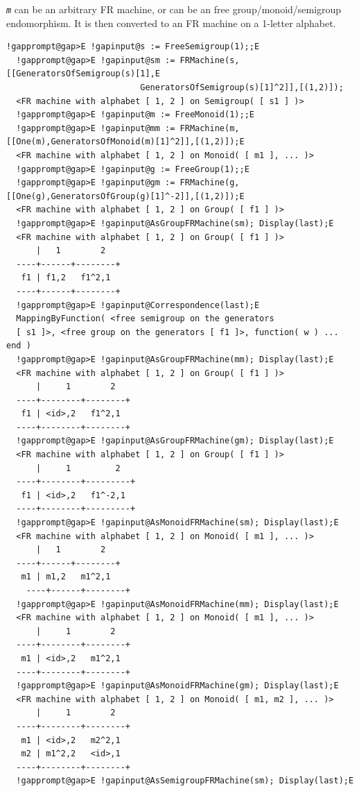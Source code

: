 \documentclass[a4paper,11pt]{report}
\begin{document}
{{{\mbox{\texttt{\mdseries\slshape m}} can be an arbitrary FR machine, or can be an free group/monoid/semigroup
endomorphism. It is then converted to an FR machine on a 1-letter alphabet. 
\begin{Verbatim}[commandchars=!@E,fontsize=\small,frame=single,label=Example]
  !gapprompt@gap>E !gapinput@s := FreeSemigroup(1);;E
  !gapprompt@gap>E !gapinput@sm := FRMachine(s,[[GeneratorsOfSemigroup(s)[1],E
                           GeneratorsOfSemigroup(s)[1]^2]],[(1,2)]);
  <FR machine with alphabet [ 1, 2 ] on Semigroup( [ s1 ] )>
  !gapprompt@gap>E !gapinput@m := FreeMonoid(1);;E
  !gapprompt@gap>E !gapinput@mm := FRMachine(m,[[One(m),GeneratorsOfMonoid(m)[1]^2]],[(1,2)]);E
  <FR machine with alphabet [ 1, 2 ] on Monoid( [ m1 ], ... )>
  !gapprompt@gap>E !gapinput@g := FreeGroup(1);;E
  !gapprompt@gap>E !gapinput@gm := FRMachine(g,[[One(g),GeneratorsOfGroup(g)[1]^-2]],[(1,2)]);E
  <FR machine with alphabet [ 1, 2 ] on Group( [ f1 ] )>
  !gapprompt@gap>E !gapinput@AsGroupFRMachine(sm); Display(last);E
  <FR machine with alphabet [ 1, 2 ] on Group( [ f1 ] )>
      |   1        2
  ----+------+--------+
   f1 | f1,2   f1^2,1
  ----+------+--------+
  !gapprompt@gap>E !gapinput@Correspondence(last);E
  MappingByFunction( <free semigroup on the generators
  [ s1 ]>, <free group on the generators [ f1 ]>, function( w ) ... end )
  !gapprompt@gap>E !gapinput@AsGroupFRMachine(mm); Display(last);E
  <FR machine with alphabet [ 1, 2 ] on Group( [ f1 ] )>
      |     1        2
  ----+--------+--------+
   f1 | <id>,2   f1^2,1
  ----+--------+--------+
  !gapprompt@gap>E !gapinput@AsGroupFRMachine(gm); Display(last);E
  <FR machine with alphabet [ 1, 2 ] on Group( [ f1 ] )>
      |     1         2
  ----+--------+---------+
   f1 | <id>,2   f1^-2,1
  ----+--------+---------+
  !gapprompt@gap>E !gapinput@AsMonoidFRMachine(sm); Display(last);E
  <FR machine with alphabet [ 1, 2 ] on Monoid( [ m1 ], ... )>
      |   1        2
  ----+------+--------+
   m1 | m1,2   m1^2,1
    ----+------+--------+
  !gapprompt@gap>E !gapinput@AsMonoidFRMachine(mm); Display(last);E
  <FR machine with alphabet [ 1, 2 ] on Monoid( [ m1 ], ... )>
      |     1        2
  ----+--------+--------+
   m1 | <id>,2   m1^2,1
  ----+--------+--------+
  !gapprompt@gap>E !gapinput@AsMonoidFRMachine(gm); Display(last);E
  <FR machine with alphabet [ 1, 2 ] on Monoid( [ m1, m2 ], ... )>
      |     1        2
  ----+--------+--------+
   m1 | <id>,2   m2^2,1
   m2 | m1^2,2   <id>,1
  ----+--------+--------+
  !gapprompt@gap>E !gapinput@AsSemigroupFRMachine(sm); Display(last);E

\end{Verbatim}}}}
\end{document}
